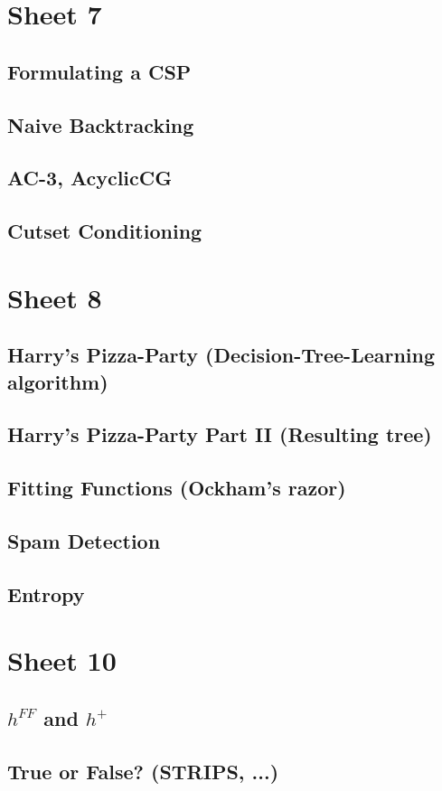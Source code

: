 \documentclass{article}
\begin{document}
\section{Sheet 7}
    \subsection{Formulating a CSP}
    \subsection{Naive Backtracking}
    \subsection{AC-3, AcyclicCG}
    \subsection{Cutset Conditioning}
    

\section{Sheet 8}
    \subsection{Harry's Pizza-Party (Decision-Tree-Learning algorithm)}
    \subsection{Harry's Pizza-Party Part II (Resulting tree)}
    \subsection{Fitting Functions (Ockham's razor)}
    \subsection{Spam Detection}
    \subsection{Entropy}
    

\section{Sheet 10}
    \subsection{$h^{FF}$ and $h^+$}
    \subsection{True or False? (STRIPS, ...)}
    
    
\end{document}
